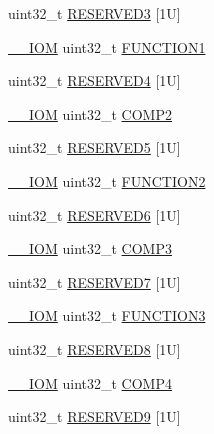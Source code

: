 \begin{DoxyCompactItemize}
uint32\+\_\+t \mbox{\hyperlink{struct_d_w_t___type_a9cc84ea2573359cd11acd5779e5a1261}{R\+E\+S\+E\+R\+V\+E\+D3}} \mbox{[}1\+U\mbox{]}
\item 
\mbox{\hyperlink{core__cm4_8h_ab6caba5853a60a17e8e04499b52bf691}{\+\_\+\+\_\+\+I\+OM}} uint32\+\_\+t \mbox{\hyperlink{struct_d_w_t___type_ae8f02e32e101c4cc61115d271fa12ffb}{F\+U\+N\+C\+T\+I\+O\+N1}}
\item 
uint32\+\_\+t \mbox{\hyperlink{struct_d_w_t___type_a1defe18fe95571e383d754b13d3f6c51}{R\+E\+S\+E\+R\+V\+E\+D4}} \mbox{[}1\+U\mbox{]}
\item 
\mbox{\hyperlink{core__cm4_8h_ab6caba5853a60a17e8e04499b52bf691}{\+\_\+\+\_\+\+I\+OM}} uint32\+\_\+t \mbox{\hyperlink{struct_d_w_t___type_aeeb1e36001c60a167399683280d6ec39}{C\+O\+M\+P2}}
\item 
uint32\+\_\+t \mbox{\hyperlink{struct_d_w_t___type_a171526446695fcdbfaf7992e567f881d}{R\+E\+S\+E\+R\+V\+E\+D5}} \mbox{[}1\+U\mbox{]}
\item 
\mbox{\hyperlink{core__cm4_8h_ab6caba5853a60a17e8e04499b52bf691}{\+\_\+\+\_\+\+I\+OM}} uint32\+\_\+t \mbox{\hyperlink{struct_d_w_t___type_a8ba3cc103077080ae3c0fc41e87d1197}{F\+U\+N\+C\+T\+I\+O\+N2}}
\item 
uint32\+\_\+t \mbox{\hyperlink{struct_d_w_t___type_a5009eeafbfdd33771613e8f36c4e6a34}{R\+E\+S\+E\+R\+V\+E\+D6}} \mbox{[}1\+U\mbox{]}
\item 
\mbox{\hyperlink{core__cm4_8h_ab6caba5853a60a17e8e04499b52bf691}{\+\_\+\+\_\+\+I\+OM}} uint32\+\_\+t \mbox{\hyperlink{struct_d_w_t___type_a20b0b62a3576ee88db4a7c065cd988ac}{C\+O\+M\+P3}}
\item 
uint32\+\_\+t \mbox{\hyperlink{struct_d_w_t___type_a0dbbc4810d588e942a16caeea77da414}{R\+E\+S\+E\+R\+V\+E\+D7}} \mbox{[}1\+U\mbox{]}
\item 
\mbox{\hyperlink{core__cm4_8h_ab6caba5853a60a17e8e04499b52bf691}{\+\_\+\+\_\+\+I\+OM}} uint32\+\_\+t \mbox{\hyperlink{struct_d_w_t___type_afbfaba1d10558329868c6c55f91f82df}{F\+U\+N\+C\+T\+I\+O\+N3}}
\item 
uint32\+\_\+t \mbox{\hyperlink{struct_d_w_t___type_af6560e8bddb551e45119bc49bcd1c52f}{R\+E\+S\+E\+R\+V\+E\+D8}} \mbox{[}1\+U\mbox{]}
\item 
\mbox{\hyperlink{core__cm4_8h_ab6caba5853a60a17e8e04499b52bf691}{\+\_\+\+\_\+\+I\+OM}} uint32\+\_\+t \mbox{\hyperlink{struct_d_w_t___type_a8ea52ce87f7d0225db1b5ba91313f4b7}{C\+O\+M\+P4}}
\item 
uint32\+\_\+t \mbox{\hyperlink{struct_d_w_t___type_add96c3a797009b4a2ff376fb8b5ef965}{R\+E\+S\+E\+R\+V\+E\+D9}} \mbox{[}1\+U\mbox{]}

\end{DoxyCompactItemize}
